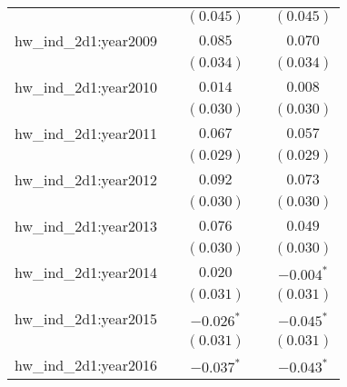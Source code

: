 \begin{center}
\begin{longtable}{l c c c c}
                         &                       & $(0.045)$             &                       & $(0.045)$             \\
hw\_ind\_2d1:year2009    &                       & $0.085$               &                       & $0.070$               \\
                         &                       & $(0.034)$             &                       & $(0.034)$             \\
hw\_ind\_2d1:year2010    &                       & $0.014$               &                       & $0.008$               \\
                         &                       & $(0.030)$             &                       & $(0.030)$             \\
hw\_ind\_2d1:year2011    &                       & $0.067$               &                       & $0.057$               \\
                         &                       & $(0.029)$             &                       & $(0.029)$             \\
hw\_ind\_2d1:year2012    &                       & $0.092$               &                       & $0.073$               \\
                         &                       & $(0.030)$             &                       & $(0.030)$             \\
hw\_ind\_2d1:year2013    &                       & $0.076$               &                       & $0.049$               \\
                         &                       & $(0.030)$             &                       & $(0.030)$             \\
hw\_ind\_2d1:year2014    &                       & $0.020$               &                       & $\mathbf{-0.004}^{*}$ \\
                         &                       & $(0.031)$             &                       & $(0.031)$             \\
hw\_ind\_2d1:year2015    &                       & $\mathbf{-0.026}^{*}$ &                       & $\mathbf{-0.045}^{*}$ \\
                         &                       & $(0.031)$             &                       & $(0.031)$             \\
hw\_ind\_2d1:year2016    &                       & $\mathbf{-0.037}^{*}$ &                       & $\mathbf{-0.043}^{*}$ \\

\end{longtable}
\end{center}
